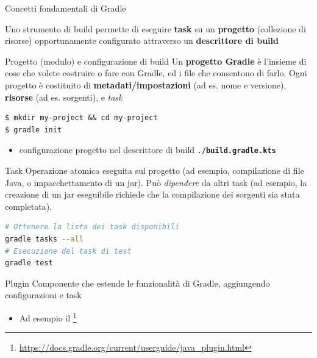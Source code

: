 \documentclass[xcolor=dvipsnames,presentation]{beamer}
\begin{document}
\begin{frame}{Concetti fondamentali di Gradle}

Uno strumento di build permette di eseguire \textbf{task} su un \textbf{progetto} (collezione di risorse) opportunamente configurato attraverso un \textbf{descrittore di build}

    \begin{block}{Progetto (modulo) e configurazione di build}
        Un \textbf{progetto Gradle} è l'insieme di cose che volete costruire o fare con Gradle, ed i file che consentono di farlo. Ogni progetto è costituito di \textbf{metadati/impostazioni} (ad es. nome e versione), \textbf{risorse} (ad es. sorgenti), e \textit{task}
\begin{lstlisting}
$ mkdir my-project && cd my-project
$ gradle init
\end{lstlisting}
\begin{itemize}
\item configurazione progetto nel descrittore di build \texttt{./\textbf{build.gradle.kts}}
\end{itemize}
    \end{block}
    \begin{block}{Task}
        Operazione atomica eseguita sul progetto (ad esempio, compilazione di file Java, o impacchettamento di un jar). Può \textit{dipendere} da altri task (ad esempio, la creazione di un jar eseguibile richiede che la compilazione dei sorgenti sia stata completata).
\begin{lstlisting}[language=bash]
# Ottenere la lista dei task disponibili
gradle tasks --all
# Esecuzione del task di test
gradle test
\end{lstlisting}
    \end{block}
    \begin{block}{Plugin}
        Componente che estende le funzionalità di Gradle, aggiungendo configurazioni e task
        \begin{itemize}
        \item Ad esempio il \footnote{\url{https://docs.gradle.org/current/userguide/java_plugin.html}}
        \end{itemize}
    \end{block}
\end{frame}
\end{document}
